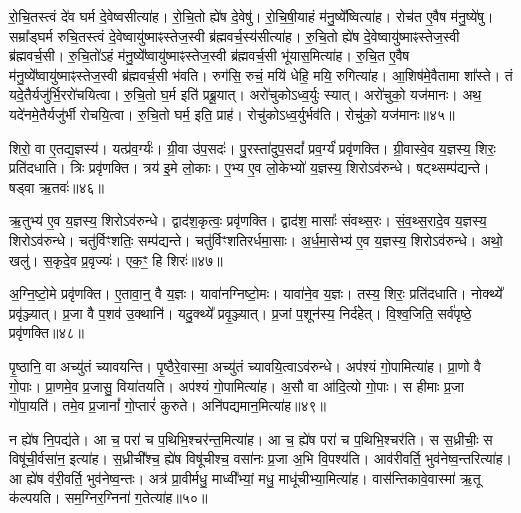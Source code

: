 रो॒चि॒तस्त्वं दे॑व घर्म दे॒वेष्वसीत्या॑ह। 
रो॒चि॒तो ह्ये॑ष दे॒वेषु॑। 
रो॒चि॒षी॒याहं म॑नु॒ष्ये᳚ष्वित्या॑ह। 
रोच॑त ए॒वैष म॑नु॒ष्ये॑षु। 
सम्रा᳚ड्घर्म रुचि॒तस्त्वं दे॒वेष्वायु॑ष्माꣴस्तेज॒स्वी ब्र॑ह्मवर्च॒स्य॑सीत्या॑ह। 
रु॒चि॒तो ह्ये॑ष दे॒वेष्वायु॑ष्माꣴस्तेज॒स्वी ब्र॑ह्मवर्च॒सी। 
रु॒चि॒तो॑ऽहं म॑नु॒ष्ये᳚ष्वायु॑ष्माꣴस्तेज॒स्वी ब्र॑ह्मवर्च॒सी भू॑यास॒मित्या॑ह। 
रु॒चि॒त ए॒वैष म॑नु॒ष्ये᳚ष्वायु॑ष्माꣴस्तेज॒स्वी ब्र॑ह्मवर्च॒सी भ॑वति। 
रुग॑सि॒ रुचं॒ मयि॑ धेहि॒ मयि॒ रुगित्या॑ह। 
आ॒शिष॑मे॒वैतामा शा᳚स्ते। 
तं यदे॒तैर्यजु॑र्भि॒ररो॑चयित्वा। 
रु॒चि॒तो घ॒र्म इति॑ प्रब्रू॒यात्। 
अरो॑चुकोऽध्व॒र्युः स्यात्। 
अरो॑चुको॒ यज॑मानः। 
अथ॒ यदे॑नमे॒तैर्यजु॑र्भी रोचयि॒त्वा। 
रु॒चि॒तो घर्म॒ इति॒ प्राह॑। 
रोचु॑कोऽध्व॒र्युर्भव॑ति। 
रोचु॑को॒ यज॑मानः॥४५॥
\anuvakamend[प॒श्चाद्रो॑चयति॒ जाग॑तेन॒ छन्द॑सा॒ पाङ्क्ते॑न॒ छन्द॑सा॒ स मा॑ रुचि॒तो रो॑च॒येत्या॑हा॒शिष॑मे॒वैतामाशा᳚स्ते शास्ते॒ऽष्टौ च॑]

शिरो॒ वा ए॒तद्य॒ज्ञस्य॑। 
यत्प्र॑व॒र्ग्यः॑। 
ग्री॒वा उ॑प॒सदः॑। 
पु॒रस्ता॑दुप॒सदां᳚ प्रव॒र्ग्यं॑ प्रवृ॑णक्ति। 
ग्री॒वास्वे॒व य॒ज्ञस्य॒ शिरः॒ प्रति॑दधाति। 
त्रिः प्रवृ॑णक्ति। 
त्रय॑ इ॒मे लो॒काः। 
ए॒भ्य ए॒व लो॒केभ्यो॑ य॒ज्ञस्य॒ शिरोऽव॑रुन्धे। 
षट्थ्सम्प॑द्यन्ते। 
षड्वा ऋ॒तवः॑॥४६॥

ऋ॒तुभ्य॑ ए॒व य॒ज्ञस्य॒ शिरोऽव॑रुन्धे। 
द्वाद॑श॒कृत्वः॒ प्रवृ॑णक्ति। 
द्वाद॑श॒ मासाः᳚ संवथ्स॒रः। 
सं॒व॒थ्स॒रादे॒व य॒ज्ञस्य॒ शिरोऽव॑रुन्धे। 
चतु॑र्विꣳशतिः॒ सम्प॑द्यन्ते। 
चतु॑र्विꣳशतिरर्धमा॒साः। 
अ॒र्ध॒मा॒सेभ्य॑ ए॒व य॒ज्ञस्य॒ शिरोऽव॑रुन्धे। 
अथो॒ खलु॑। 
स॒कृदे॒व प्र॒वृज्यः॑। 
एक॒ꣳ॒ हि शिरः॑॥४७॥

अ॒ग्नि॒ष्टो॒मे प्रवृ॑णक्ति। 
ए॒तावा॒न्॒ वै य॒ज्ञः। 
यावा॑नग्निष्टो॒मः। 
यावा॑ने॒व य॒ज्ञः। 
तस्य॒ शिरः॒ प्रति॑दधाति। 
नोक्थ्ये᳚ प्रवृ॑ञ्ज्यात्। 
प्र॒जा वै प॒शव॑ उ॒क्थानि॑। 
यदु॒क्थ्ये᳚ प्रवृ॒ञ्ज्यात्। 
प्र॒जां प॒शून॑स्य॒ निर्द॑हेत्। 
वि॒श्व॒जिति॒ सर्व॑पृष्ठे॒ प्रवृ॑णक्ति॥४८॥

पृ॒ष्ठानि॒ वा अच्यु॑तं च्यावयन्ति। 
पृ॒ष्ठैरे॒वास्मा॒ अच्यु॑तं च्यावयि॒त्वाऽव॑रुन्धे। 
अप॑श्यं गो॒पामित्या॑ह। 
प्रा॒णो वै गो॒पाः। 
प्रा॒णमे॒व प्र॒जासु॒ विया॑तयति। 
अप॑श्यं गो॒पामित्या॑ह। 
अ॒सौ वा आ॑दि॒त्यो गो॒पाः। 
स हीमाः प्र॒जा गो॑पा॒यति॑। 
तमे॒व प्र॒जानां᳚ गो॒प्तारं॑ कुरुते। 
अनि॑पद्यमान॒मित्या॑ह॥४९॥

न ह्ये॑ष नि॒पद्य॑ते। 
आ च॒ परा॑ च प॒थिभि॒श्चर॑न्त॒मित्या॑ह। 
आ च॒ ह्ये॑ष परा॑ च प॒थिभि॒श्चर॑ति। 
स स॒ध्रीचीः॒ स विषू॑ची॒र्वसा॑न॒ इत्या॑ह। 
स॒ध्रीची᳚श्च॒ ह्ये॑ष विषू॑चीश्च॒ वसा॑नः प्र॒जा अ॒भि वि॒पश्य॑ति। 
आव॑रीवर्ति॒ भुव॑नेष्व॒न्तरित्या॑ह। 
आ ह्ये॑ष व॑री॒वर्ति॒ भुव॑नेष्व॒न्तः। 
अत्र॑ प्रा॒वीर्मधु॒ माध्वी᳚भ्यां॒ मधु॒ माधू॑चीभ्या॒मित्या॑ह। 
वास॑न्तिकावे॒वास्मा॑ ऋ॒तू क॑ल्पयति। 
सम॒ग्निर॒ग्निना॑ ग॒तेत्या॑ह॥५०॥

